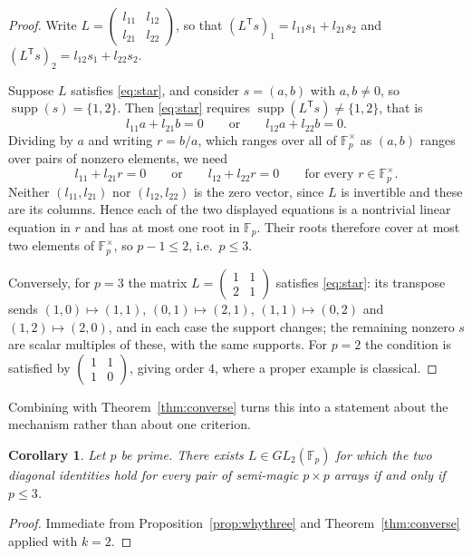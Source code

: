 \documentclass[11pt,a4paper]{amsart}
\theoremstyle{plain}
\newtheorem{corollary}[theorem]{Corollary}
\theoremstyle{definition}
\theoremstyle{remark}
\newcommand{\FF}{\mathbb{F}}
\newcommand{\supp}{\operatorname{supp}}
\newcommand{\tr}{\mathsf{T}}
\begin{document}
\begin{proof}
Write $L=\begin{pmatrix}l_{11}&l_{12}\\l_{21}&l_{22}\end{pmatrix}$, so that
$(L^{\tr}s)_1=l_{11}s_1+l_{21}s_2$ and $(L^{\tr}s)_2=l_{12}s_1+l_{22}s_2$.

Suppose $L$ satisfies \eqref{eq:star}, and consider $s=(a,b)$ with
$a,b\ne0$, so $\supp(s)=\{1,2\}$. Then \eqref{eq:star} requires
$\supp(L^{\tr}s)\ne\{1,2\}$, that is
\[
l_{11}a+l_{21}b=0 \qquad\text{or}\qquad l_{12}a+l_{22}b=0 .
\]
Dividing by $a$ and writing $r=b/a$, which ranges over all of $\FF_p^{\times}$
as $(a,b)$ ranges over pairs of nonzero elements, we need
\[
l_{11}+l_{21}r=0 \qquad\text{or}\qquad l_{12}+l_{22}r=0
\qquad\text{for every } r\in\FF_p^{\times}.
\]
Neither $(l_{11},l_{21})$ nor $(l_{12},l_{22})$ is the zero vector, since $L$ is
invertible and these are its columns. Hence each of the two displayed equations
is a nontrivial linear equation in $r$ and has at most one root in $\FF_p$.
Their roots therefore cover at most two elements of $\FF_p^{\times}$, so
$p-1\le2$, i.e.\ $p\le3$.

Conversely, for $p=3$ the matrix $L=\begin{pmatrix}1&1\\2&1\end{pmatrix}$
satisfies \eqref{eq:star}: its transpose sends $(1,0)\mapsto(1,1)$,
$(0,1)\mapsto(2,1)$, $(1,1)\mapsto(0,2)$ and $(1,2)\mapsto(2,0)$, and in each
case the support changes; the remaining nonzero $s$ are scalar multiples of
these, with the same supports. For $p=2$ the condition is satisfied by
$\begin{pmatrix}1&1\\1&0\end{pmatrix}$, giving order $4$, where a proper
example is classical.
\end{proof}

Combining with Theorem~\ref{thm:converse} turns this into a statement about the
mechanism rather than about one criterion.

\begin{corollary}\label{cor:whythree}
Let $p$ be prime. There exists $L\in GL_2(\FF_p)$ for which the two diagonal
identities hold for \emph{every} pair of semi-magic $p\times p$ arrays if and
only if $p\le3$.
\end{corollary}

\begin{proof}
Immediate from Proposition~\ref{prop:whythree} and
Theorem~\ref{thm:converse} applied with $k=2$.
\end{proof}
\end{document}
